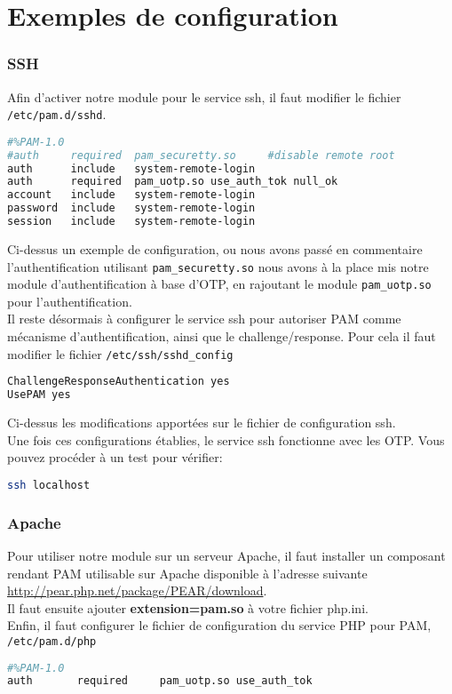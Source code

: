 \documentclass{"../../../res/univ-projet"}
\begin{document}
\newpage

\part{Exemples de configuration}
\section{SSH}
Afin d'activer notre module pour le service ssh, il faut modifier le fichier \verb?/etc/pam.d/sshd?.
\begin{lstlisting}[language=bash, backgroundcolor=\color{black}, basicstyle=\color{white}]
#%PAM-1.0
#auth     required  pam_securetty.so     #disable remote root
auth      include   system-remote-login
auth      required  pam_uotp.so use_auth_tok null_ok
account   include   system-remote-login
password  include   system-remote-login
session   include   system-remote-login
\end{lstlisting}
Ci-dessus un exemple de configuration, ou nous avons passé en commentaire l'authentification utilisant
\verb?pam_securetty.so? nous avons à la place mis notre module d'authentification à base d'OTP, en rajoutant le 
module \verb?pam_uotp.so? pour l'authentification.\\
Il reste désormais à configurer le service ssh pour autoriser PAM comme mécanisme d'authentification, 
ainsi que le challenge/response. Pour cela il faut modifier le fichier \verb?/etc/ssh/sshd_config?
\begin{lstlisting}[language=bash, backgroundcolor=\color{black}, basicstyle=\color{white}]
ChallengeResponseAuthentication yes
UsePAM yes
\end{lstlisting}
Ci-dessus les modifications apportées sur le fichier de configuration ssh.\\
Une fois ces configurations établies, le service ssh fonctionne avec les OTP.
Vous pouvez procéder à un test pour vérifier:
\begin{lstlisting}[language=bash, backgroundcolor=\color{black}, basicstyle=\color{white}]
ssh localhost
\end{lstlisting}

\section{Apache}
Pour utiliser notre module sur un serveur Apache, il faut installer un composant rendant PAM utilisable
sur Apache disponible à l'adresse suivante 
\href{http://pear.php.net/package/PEAR/download}{http://pear.php.net/package/PEAR/download}.\\
Il faut ensuite ajouter \textbf{extension=pam.so} à votre fichier php.ini.\\
Enfin, il faut configurer le fichier de configuration du service PHP pour PAM, \verb?/etc/pam.d/php?
\begin{lstlisting}[language=bash, backgroundcolor=\color{black}, basicstyle=\color{white}]
#%PAM-1.0
auth       required     pam_uotp.so use_auth_tok
\end{lstlisting}
\end{document}
